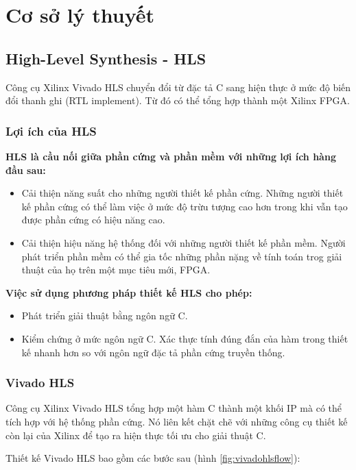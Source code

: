 \chapter{Cơ sở lý thuyết} \label{chap:theory}
    \section{High-Level Synthesis - HLS}
    Công cụ Xilinx Vivado HLS chuyển đổi từ đặc tả C sang hiện thực ở mức độ biến đổi thanh ghi (RTL implement). Từ đó có thể tổng hợp thành một Xilinx FPGA. 
        \subsection{Lợi ích của HLS}
        \textbf{HLS là cầu nối giữa phần cứng và phần mềm với những lợi ích hàng đầu sau:}
        \begin{itemize}
            \item Cải thiện năng suất cho những người thiết kế phần cứng.
            Những người thiết kế phần cứng có thể làm việc ở mức độ trừu tượng cao hơn trong khi vẫn tạo được phần cứng có hiệu năng cao.
            \item Cải thiện hiệu năng hệ thống đối với những người thiết kế phần mềm.
            Người phát triển phần mềm có thể gia tốc những phần nặng về tính toán trog giải thuật của họ trên một mục tiêu mới, FPGA.
        \end{itemize}
        \textbf{Việc sử dụng phương pháp thiết kế HLS cho phép:}
        \begin{itemize}
            \item Phát triển giải thuật bằng ngôn ngữ C.
            \item Kiểm chứng ở mức ngôn ngữ C.
            Xác thực tính đúng đắn của hàm trong thiết kế nhanh hơn so với ngôn ngữ đặc tả phần cứng truyền thống.
        \end{itemize}
        \subsection{Vivado HLS}
        Công cụ Xilinx Vivado HLS tổng hợp một hàm C thành một khối IP mà có thể tích hợp với hệ thống phần cứng. Nó liên kết chặt chẽ với những công cụ thiết kế còn lại của Xilinx để tạo ra hiện thực tối ưu cho giải thuật C.
        
        Thiết kế Vivado HLS bao gồm các bước sau (hình \ref{fig:vivadohlsflow}):
        
